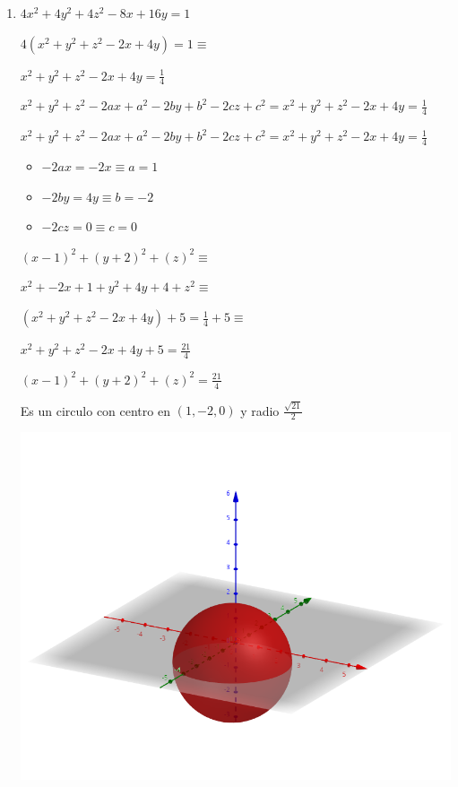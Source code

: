 \documentclass[../practica_01.tex]{subfiles}
\begin{document}
\begin{enumerate}
        \item $4x^2 + 4y^2 + 4z^2 - 8x + 16y = 1$

            $4(x^2 + y^2 + z^2 - 2x + 4y) = 1 \equiv$

            $x^2 + y^2 + z^2 - 2x + 4y = \frac{1}{4}$

            $x^2 + y^2 + z^2 - 2ax + a^2 - 2by + b^2 - 2cz + c^2 = x^2 + y^2 + z^2 - 2x + 4y = \frac{1}{4}$

            $x^2 + y^2 + z^2 - 2ax + a^2 - 2by + b^2 - 2cz + c^2 = x^2 + y^2 + z^2 - 2x + 4y = \frac{1}{4}$

            \begin{itemize}
                \item $-2ax = -2x \equiv a = 1$
                \item $-2by = 4y \equiv b = -2$
                \item $-2cz = 0 \equiv c = 0$
            \end{itemize}

            $(x-1)^2+(y+2)^2+(z)^2 \equiv$

            $x^2 + -2x + 1 + y^2 + 4y + 4 + z^2 \equiv$

            $(x^2 + y^2 + z^2 - 2x + 4y) + 5 = \frac{1}{4} + 5 \equiv$

            $x^2 + y^2 + z^2 - 2x + 4y + 5 = \frac{21}{4} $

            $(x-1)^2+(y+2)^2+(z)^2 = \frac{21}{4} $

            Es un circulo con centro en $(1,-2,0)$ y radio $\frac{\sqrt{21}}{2}$

            \includegraphics[scale=0.2]{ej02/resources/2b.png} $ $

    \end{enumerate}
\end{document}
